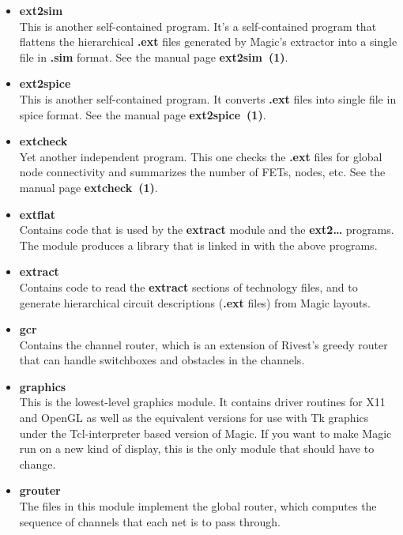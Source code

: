 \documentclass[letterpaper,twoside,12pt]{article}
\begin{document}
\begin{itemize}
\item {\bfseries ext2sim} \\ 
This is another self-contained program.  It's
a self-contained program that flattens the hierarchical {\bfseries .ext}
files generated by Magic's extractor into a single file in {\bfseries .sim}
format.  See the manual page {\bfseries ext2sim~(1)}.

\item {\bfseries ext2spice}  \\
This is another self-contained program.  It converts {\bfseries .ext}
files into single file in spice format.  
See the manual page {\bfseries ext2spice~(1)}.

\item {\bfseries extcheck}  \\
Yet another independent program.  This one checks the {\bfseries .ext}
files for global node connectivity and summarizes the number of FETs,
nodes, etc.  See the manual page {\bfseries extcheck~(1)}.

\item {\bfseries extflat}  \\
Contains code that is used by the {\bfseries extract} module and the
{\bfseries ext2\dots}
programs.  The module produces a library that is linked in with the above
programs.

\item {\bfseries extract}  \\
Contains code to read the {\bfseries extract} sections of technology files,
and to generate hierarchical circuit descriptions ({\bfseries .ext} files)
from Magic layouts.

\item {\bfseries gcr}  \\
Contains the channel router, which is an extension of Rivest's
greedy router that can handle switchboxes and obstacles in the
channels.

\item {\bfseries graphics} \\ 
This is the lowest-level graphics module.  It contains driver
routines for X11 and OpenGL as well as the equivalent versions
for use with Tk graphics under the Tcl-interpreter based version
of Magic.  If you want to make Magic run on a new kind of
display, this is the only module that should have to change.

\item {\bfseries grouter}  \\
The files in this module implement the global router, which
computes the sequence of channels that each net is to pass
through.


\end{itemize}
\end{document}
